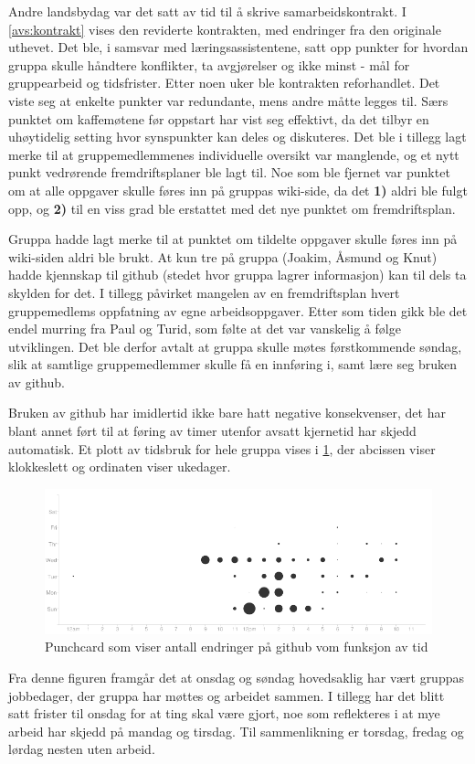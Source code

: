 Andre landsbydag var det satt av tid til å skrive samarbeidskontrakt. 
I \cref{avs:kontrakt} vises den reviderte kontrakten, med endringer fra den
originale uthevet. Det ble, i
samsvar med læringsassistentene, satt opp punkter for hvordan gruppa skulle
håndtere konflikter, ta avgjørelser og ikke minst - mål for gruppearbeid og
tidsfrister. Etter noen uker ble kontrakten reforhandlet. Det viste seg at
enkelte punkter var redundante, mens andre måtte legges til. Særs punktet om
kaffemøtene før oppstart har vist seg effektivt, da det tilbyr en uhøytidelig
setting hvor synspunkter kan deles og diskuteres. Det ble i
tillegg lagt merke til at gruppemedlemmenes individuelle oversikt var manglende, og et nytt
punkt vedrørende fremdriftsplaner ble lagt til. Noe som ble fjernet var punktet
om at alle oppgaver skulle føres inn på gruppas wiki-side, da det \textbf{1)} aldri ble
fulgt opp, og \textbf{2)} til en viss grad ble erstattet med det nye punktet om
fremdriftsplan. 

Gruppa hadde lagt merke til at punktet om tildelte oppgaver skulle føres
inn på wiki-siden aldri ble brukt. At kun tre på gruppa (Joakim, Åsmund og Knut)
hadde kjennskap til github (stedet hvor gruppa lagrer informasjon) kan til dels
ta skylden for det. I tillegg påvirket mangelen av en fremdriftsplan hvert
gruppemedlems oppfatning av egne arbeidsoppgaver. Etter som tiden gikk ble det
endel murring fra Paul og Turid, som følte at det var vanskelig
å følge utviklingen. Det ble derfor avtalt at gruppa skulle møtes førstkommende
søndag, slik at samtlige gruppemedlemmer skulle få en innføring i, samt lære seg
bruken av github. 

Bruken av github har imidlertid ikke bare hatt negative konsekvenser, det har blant annet
ført til at føring av timer utenfor avsatt kjernetid har skjedd automatisk. Et
plott av tidsbruk for hele gruppa vises i \cref{fig:punchcard}, der abcissen
viser klokkeslett og ordinaten viser ukedager.
\begin{figure}[ht!]
  \begin{center}
    \includegraphics[width=\textwidth]{punchcard.png}
  \end{center}
  \caption{Punchcard som viser antall endringer på github vom funksjon av tid}
  \label{fig:punchcard}
\end{figure}
Fra denne figuren framgår det at onsdag og søndag hovedsaklig har vært gruppas
jobbedager, der gruppa har møttes og arbeidet sammen. I tillegg har det blitt satt
frister til onsdag for at ting skal være gjort, noe som reflekteres i at mye
arbeid har skjedd på mandag og tirsdag. Til sammenlikning er torsdag, fredag og
lørdag nesten uten arbeid.

